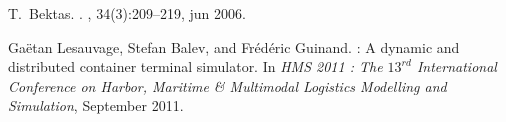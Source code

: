 \documentclass[table]{beamer}
\begin{document}
\begin{frame}{}
\begin{columns}
\begin{column}{.945\paperwidth}
{\begin{multicols}{2}
\begin{thebibliography}{10}
	  T.~Bektas.
	  .
	  , 34(3):209--219, jun 2006.
	  
	  Ga{\"e}tan Lesauvage, Stefan Balev, and Fr{\'e}d{\'e}ric Guinand.
	   : A dynamic and distributed container terminal
	  simulator.
	  \newblock In {\em HMS 2011 : The $13^{rd}$ International Conference on Harbor,
	  Maritime {\&} Multimodal Logistics Modelling and Simulation}, September 2011.
	  
	\end{thebibliography}
	\end{multicols}
      }
    \end{column}
  \end{columns}

\end{frame}
\end{document}
